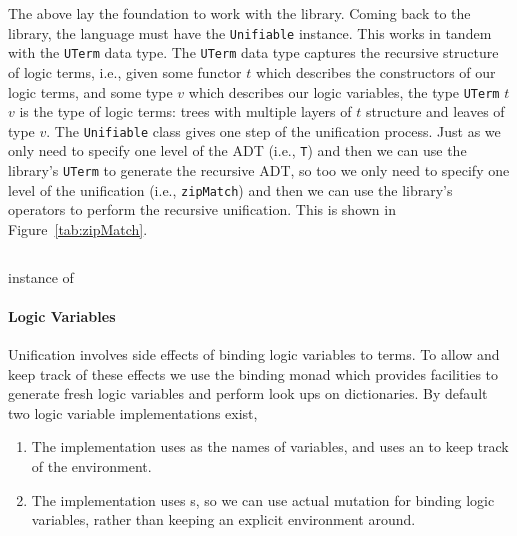 \documentclass[thesis-solanki.tex]{subfiles}
\begin{document}
The above lay the foundation to work with the library.
Coming back to the library, the language must have the \Verb!Unifiable! instance.
This works in tandem with the \Verb!UTerm! data type.
The \Verb!UTerm! data type captures the recursive structure of logic terms, i.e., given
some functor \(t\) which describes the 
constructors of our logic terms, and some type \(v\) which describes our logic variables, the type
\Verb!UTerm! \(t\) \(v\) is the
type of logic terms: trees with multiple layers of \(t\) structure and leaves of type \(v\).
The \Verb!Unifiable! class gives one step of the unification process.
Just as we only need to specify one level of the ADT (i.e., \Verb!T!) and then we can use the library's \Verb!UTerm! to generate
the recursive ADT, so too we only need to specify one level of the unification (i.e., \Verb!zipMatch!) and then we can use
the library's operators to perform the recursive unification.
This is shown in Figure~\ref{tab:zipMatch}.
\begin{code-list}[H]
  \begin{singlespace}
    \inputminted[linenos]{haskell}{haskell-proto1-zip-flat.hs}
  \end{singlespace}
  \vspace*{-0.5\baselineskip}
  \caption{\protect{} instance of \protect{}}
  \label{tab:zipMatch}
\end{code-list}

\paragraph{Logic Variables}
Unification involves side effects of binding logic variables to terms. To allow and keep track of these effects we use the binding monad
which provides facilities to generate fresh logic variables and perform look ups on dictionaries. By default two logic variable
implementations exist,

\begin{enumerate}
\item The  implementation uses  as the names of variables, and uses an
   to keep track of the environment. 

\item The  implementation uses s, so we can use actual mutation for binding logic
  variables, rather than keeping an explicit environment around.

\end{enumerate}
\end{document}
